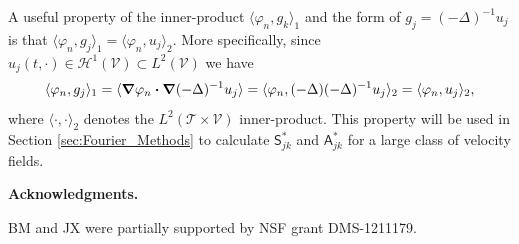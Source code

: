 \documentclass[leqno,onefignum,onetabnum]{siamltex1213}
\newcommand{\Tc}{\mathcal{T}}
\newcommand{\Vc}{\mathcal{V}}
\newcommand{\Sm}{\mathsf{S}}
\newcommand{\Am}{\mathsf{A}}
\newcommand{\Hs}{\mathscr{H}}
\newcommand\bnabla{\mbox{\boldmath${\nabla}$}}
\providecommand\bcdot{\boldsymbol{\cdot}}
\begin{document}
A useful property of the inner-product $\langle\varphi_n,g_k\rangle_1$ and the form of
$g_j=(-\Delta)^{-1}u_j$ is that $\langle\varphi_n,g_j\rangle_1=\langle\varphi_n,u_j\rangle_2$. More
specifically, since $u_j(t,\cdot)\in\Hs^1(\Vc)\subset L^2(\Vc)$ we have
\cite{Stakgold:BVP:2000}  
%
\begin{align}\label{eq:H1_to_L2}
  \langle\varphi_n,g_j\rangle_1=\langle\bnabla \varphi_n\bcdot\bnabla (-\Delta)^{-1}u_j\rangle
         =\langle\varphi_n,(-\Delta)(-\Delta)^{-1}u_j\rangle_2
         =\langle\varphi_n,u_j\rangle_2,
\end{align}
%
where $\langle\cdot,\cdot\rangle_2$ denotes the $L^2(\Tc\times\Vc)$ inner-product. This
property will be used in Section \ref{sec:Fourier_Methods} to
calculate $\Sm^*_{jk}$ and $\Am^*_{jk}$ for a large class of velocity
fields.   







\medskip

{\bf Acknowledgments.}

BM and JX were partially supported by NSF grant DMS-1211179.

\medskip









\end{document}

